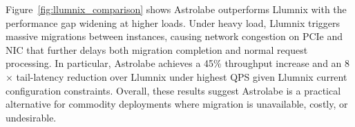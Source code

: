 Figure~\ref{fig:llumnix_comparison} shows Astrolabe outperforms Llumnix with the performance gap widening at higher loads. Under heavy load, Llumnix triggers massive migrations between instances, causing network congestion on PCIe and NIC that further delays both migration completion and normal request processing. In particular, Astrolabe achieves a 45\% throughput increase and an 8$\times$ tail-latency reduction over Llumnix under highest QPS given Llumnix current configuration constraints. Overall, these results suggest Astrolabe is a practical alternative for commodity deployments where migration is unavailable, costly, or undesirable.





